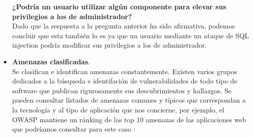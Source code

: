 \documentclass[a4paper,oneside]{article}
\begin{document}
\begin{itemize}
\textbf{¿Podría un usuario utilizar algún componente para elevar sus privilegios
a los de administrador?}\\
Dado que la respuesta a la pregunta anterior ha sido afirmativa, podemos concluir que esta también lo es ya que un usuario mediante un ataque de SQL injection podría modificar sus privilegios a los de administrador.

\item \textbf{Amenazas clasificadas}.\\
Se clasifican e identifican amenazas constantemente. Existen varios grupos dedicados a la búsqueda e identifación de vulnerabilidades de todo tipo de software que publican rigurosamente sus descubrimientos y hallazgos. Se pueden consultar listados de amenazas comunes y típicos que correspondan a la tecnología y al tipo de aplicación que nos concierne, por ejemplo, el OWASP mantiene un ránking de las top 10 amenazas de las aplicaciones web que podríamos consultar para este caso \cite{owasp}:


\end{itemize}
\end{document}
